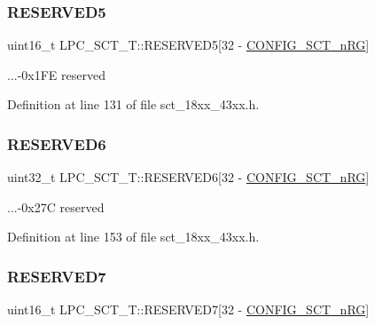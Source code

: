 \subsubsection{\texorpdfstring{R\+E\+S\+E\+R\+V\+E\+D5}{RESERVED5}}
{\footnotesize\ttfamily uint16\+\_\+t L\+P\+C\+\_\+\+S\+C\+T\+\_\+\+T\+::\+R\+E\+S\+E\+R\+V\+E\+D5\mbox{[}32 -\/ \hyperlink{group___s_c_t__18_x_x__43_x_x_ga8d80e251208a01483a6b00c81ecb7493}{C\+O\+N\+F\+I\+G\+\_\+\+S\+C\+T\+\_\+n\+RG}\mbox{]}}

...-\/0x1\+FE reserved 

Definition at line 131 of file sct\+\_\+18xx\+\_\+43xx.\+h.

\mbox{\label{struct_l_p_c___s_c_t___t_a6153367d38a8160ce681b7891f202714}} 
\subsubsection{\texorpdfstring{R\+E\+S\+E\+R\+V\+E\+D6}{RESERVED6}}
{\footnotesize\ttfamily uint32\+\_\+t L\+P\+C\+\_\+\+S\+C\+T\+\_\+\+T\+::\+R\+E\+S\+E\+R\+V\+E\+D6\mbox{[}32 -\/ \hyperlink{group___s_c_t__18_x_x__43_x_x_ga8d80e251208a01483a6b00c81ecb7493}{C\+O\+N\+F\+I\+G\+\_\+\+S\+C\+T\+\_\+n\+RG}\mbox{]}}

...-\/0x27C reserved 

Definition at line 153 of file sct\+\_\+18xx\+\_\+43xx.\+h.

\mbox{\label{struct_l_p_c___s_c_t___t_a65a3744046115228c56e66a850204280}} 
\subsubsection{\texorpdfstring{R\+E\+S\+E\+R\+V\+E\+D7}{RESERVED7}}
{\footnotesize\ttfamily uint16\+\_\+t L\+P\+C\+\_\+\+S\+C\+T\+\_\+\+T\+::\+R\+E\+S\+E\+R\+V\+E\+D7\mbox{[}32 -\/ \hyperlink{group___s_c_t__18_x_x__43_x_x_ga8d80e251208a01483a6b00c81ecb7493}{C\+O\+N\+F\+I\+G\+\_\+\+S\+C\+T\+\_\+n\+RG}\mbox{]}}

